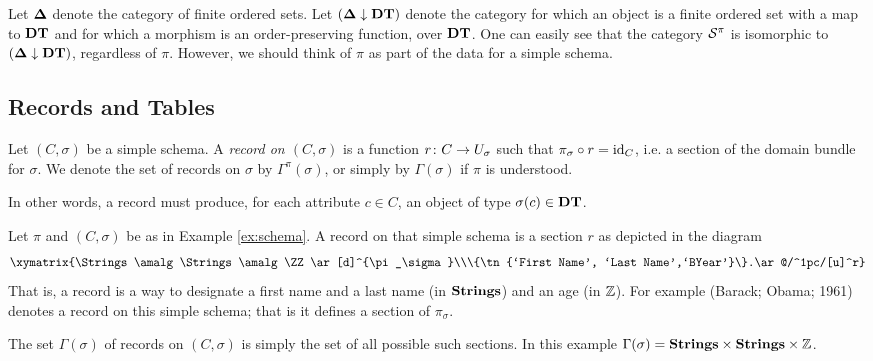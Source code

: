 \documentclass{amsart}
\begin{document}
\begin{remark}\label{rem:fin down DT}

Let ${\bf \Delta}$ denote the category of finite ordered sets.  Let $({\bf \Delta}\downarrow{\bf DT})$ denote the category for which an object is a finite ordered set with a map to ${\bf DT}$ and for which a morphism is an order-preserving function, over ${\bf DT}$.  One can easily see that the category $\mathcal{S}^\pi$ is isomorphic to $({\bf \Delta}\downarrow{\bf DT})$, regardless of $\pi$.  However, we should think of $\pi$ as part of the data for a simple schema.  

\end{remark}

\subsection{Records and Tables}

\begin{definition}\label{def:records}

Let $(C,\sigma)$ be a simple schema.  A {\em record on $(C,\sigma)$} is a function $r\colon C\rightarrow U_\sigma$ such that $\pi_\sigma\circ r=\textnormal{id}_C$, i.e. a section of the domain bundle for $\sigma$.  We denote the set of records on $\sigma$ by $\Gamma^\pi(\sigma)$, or simply by $\Gamma(\sigma)$ if $\pi$ is understood.

\end{definition}

In other words, a record must produce, for each attribute $c\in C$, an object of type $\sigma(c)\in{\bf DT}$.  

\begin{example}\label{ex:record}

Let $\pi$ and $(C,\sigma)$ be as in Example \ref{ex:schema}.  A record on that simple schema is a section $r$ as depicted in the diagram $$\xymatrix{\Strings\amalg\Strings\amalg\ZZ\ar[d]^{\pi_\sigma}\\\{\tn{`First Name', `Last Name',`BYear'}\}.\ar@/^1pc/[u]^r}$$  That is, a record is a way to designate a first name and a last name (in ${\bf Strings}$) and an age (in ${\mathbb Z}$).  For example (Barack; Obama; 1961) denotes a record on this simple schema; that is it defines a section of $\pi_\sigma$.

The set $\Gamma(\sigma)$ of records on $(C,\sigma)$ is simply the set of all possible such sections.  In this example $\Gamma(\sigma)={\bf Strings}\times{\bf Strings}\times{\mathbb Z}$.

\end{example}
\end{document}
